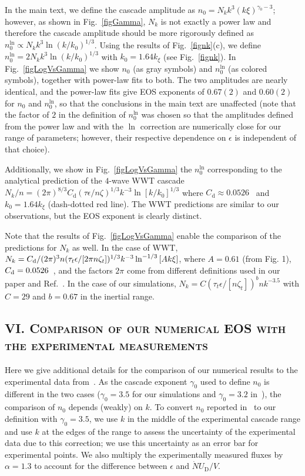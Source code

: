 \documentclass[prl,aps,twocolumn, a4paper,longbibliography,superscriptaddress]{revtex4-2}
\newcommand{\UD}{U_{\textrm{D}}}
\begin{document}
In the main text, we define the cascade amplitude as $n_0=N_k k^{3} (k\xi)^{\gamma_0-3}$; however, as shown in Fig.~\ref{figGamma}, $N_k$ is not exactly a power law and therefore the cascade amplitude should be more rigorously defined as $n_0^{\textrm{ln}}\propto N_kk^{3} \ln(k/k_0)^{1/3}$. Using the results of Fig.~\ref{fignk}(c), we define $n_0^{\textrm{ln}}=2N_kk^{3} \ln(k/k_0)^{1/3}$ with $k_0=1.64k_\xi$ (see Fig.~\ref{fignk}). In Fig.~\ref{figLogVsGamma} we show $n_0$ (as gray symbols) and $n_0^{\textrm{ln}}$ (as colored symbols), together with power-law fits to both. The two amplitudes are nearly identical, and the power-law fits give EOS exponents of $0.67(2)$ and $0.60(2)$ for $n_0$ and $n_0^{\textrm{ln}}$, so that the conclusions in the main text are unaffected (note that the factor of $2$ in the definition of $n_0^\textrm{ln}$ was chosen so that the amplitudes defined from the power law and with the $\ln$ correction are numerically close for our range of parameters; however, their respective dependence on $\epsilon$ is independent of that choice).

Additionally, we show in Fig.~\ref{figLogVsGamma} the $n_0^{\textrm{ln}}$ corresponding to the analytical prediction of the $4$-wave WWT cascade $N_k/n=(2\pi)^{8/3} C_\textrm{d}(\tau\epsilon/n\zeta)^{1/3}k^{-3}\ln[k/k_0]^{1/3}$ where $C_\textrm{d}\approx0.0526$~\cite{Zhu:2023a} and $k_0=1.64k_\xi$ (dash-dotted red line). The WWT predictions are similar to our observations, but the EOS exponent is clearly distinct.

Note that the results of Fig.~\ref{figLogVsGamma} enable the comparison of the predictions for $N_k$ as well. In the case of WWT, $N_k=C_{\rm d}/(2\pi)^3 n (\tau_t\epsilon/[2\pi n\zeta_t])^{1/3} k^{-3} \ln^{-1/3}{[A k \xi]}$, where $A=0.61$ (from Fig. 1), $C_{\rm d}=0.0526$~\cite{Zhu:2023a}, and the factors $2\pi$ come from different definitions used in our paper and Ref.~\cite{Zhu:2023a}. In the case of our simulations, $N_k=C(\tau_t\epsilon/[n\zeta_t])^b n k^{-3.5}$ with $C=29$ and $b=0.67$ in the inertial range.

\subsection{\textsc{VI. Comparison of our numerical EOS with the experimental measurements}}


Here we give additional details for the comparison of our numerical results to the experimental data from~\cite{Dogra:2023}. As the cascade exponent $\gamma_0$ used to define $n_0$ is different in the two cases ($\gamma_0=3.5$ for our simulations and $\gamma_0=3.2$ in~\cite{Dogra:2023}), the comparison of $n_0$ depends (weakly) on $k$. To convert $n_0$ reported in~\cite{Dogra:2023} to our definition with $\gamma_0=3.5$, we use $k$ in the middle of the experimental cascade range and use $k$ at the edges of the range to assess the uncertainty of the experimental data due to this correction; we use this uncertainty as an error bar for experimental points. We also multiply the experimentally measured fluxes by $\alpha=1.3$ to account for the difference between $\epsilon$ and $\dot{N}\UD/V$.
\end{document}
